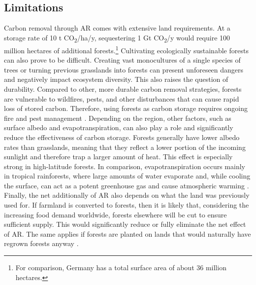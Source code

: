 \subsection*{Limitations}
Carbon removal through AR comes with extensive land requirements. At a storage rate of 10 t CO\textsubscript{2}/ha/y, sequestering 1 Gt CO\textsubscript{2}/y would require 100 million hectares of additional forests.\footnote{For comparison, Germany has a total surface area of about 36 million hectares.} Cultivating ecologically sustainable forests can also prove to be difficult. Creating vast monocultures of a single species of trees or turning previous grasslands into forests can present unforeseen dangers and negatively impact ecosystem diversity. This also raises the question of durability. Compared to other, more durable carbon removal strategies, forests are vulnerable to wildfires, pests, and other disturbances that can cause rapid loss of stored carbon. Therefore, using forests as carbon storage requires ongoing fire and pest management \parencite[216]{Watson2000LandForestry}. Depending on the region, other factors, such as surface albedo and evapotranspiration, can also play a role and significantly reduce the effectiveness of carbon storage. Forests generally have lower albedo rates than grasslands, meaning that they reflect a lower portion of the incoming sunlight and therefore trap a larger amount of heat. This effect is especially strong in high-latitude forests. In comparison, evapotranspiration occurs mainly in tropical rainforests, where large amounts of water evaporate and, while cooling the surface, can act as a potent greenhouse gas and cause atmospheric warming \parencite[46]{NRC2015ClimateSequestration}. Finally, the net additionally of AR also depends on what the land was previously used for. If farmland is converted to forests, then it is likely that, considering the increasing food demand worldwide, forests elsewhere will be cut to ensure sufficient supply. This would significantly reduce or fully eliminate the net effect of AR. The same applies if forests are planted on lands that would naturally have regrown forests anyway \parencite[128]{Gates2021HowDisaster}.\\
